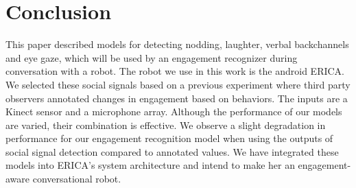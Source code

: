 \documentclass[letterpaper]{article} %
\begin{document}
\vspace{-3.63mm}
\section{Conclusion}
This paper described models for detecting nodding, laughter, verbal backchannels and eye gaze, which will be used by an engagement recognizer during conversation with a robot. The robot we use in this work is the android ERICA. We selected these social signals based on a previous experiment where third party observers annotated changes in engagement based on behaviors. The inputs are a Kinect sensor and a microphone array. Although the performance of our models are varied, their combination is effective. We observe a slight degradation in performance for our engagement recognition model when using the outputs of social signal detection compared to annotated values. We have integrated these models into ERICA's system architecture and intend to make her an engagement-aware conversational robot.
\end{document}
